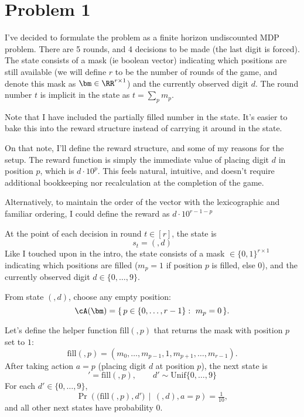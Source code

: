 \documentclass[12pt]{article}
\begin{document}
\psetheader %

\section*{Problem 1}


I've decided to formulate the problem as a finite horizon undiscounted MDP problem. There
are 5 rounds, and 4 decisions to be made (the last digit is forced). The state consists of a mask
(ie boolean vector) indicating which positions are still available (we will define
$r$ to be the number of rounds of the game, and denote this mask as $\bm \in \RR^{r \times 1}$)
and the currently observed digit $d$. The round number $t$ is implicit in the state as $t=\sum_p m_p$.

Note that I have  included the partially filled number in the state. It's easier to bake this
into the reward structure instead of carrying it around in the state.

On that note, I'll define the reward structure, and some of my reasons for the setup. The reward
function is simply the immediate value of placing digit $d$ in position $p$, which is $d\cdot 10^p$. This
feels natural, intuitive, and doesn't require additional bookkeeping nor recalculation at the completion
of the game.

Alternatively, to maintain the order of the vector with the lexicographic and familiar ordering, I could define
the reward as $d\cdot 10^{r-1-p}$

\medskip
\noindent{} At the point of each decision in round $t \in [r]$, the state is
$$s_t = (\bm,d)$$
Like I touched upon in the intro, the state consists of a mask $\bm \in \{0,1\}^{r \times 1}$ indicating which positions are filled
($m_p=1$ if position $p$ is filled, else $0$), and the currently observed digit $d \in \{0,\ldots,9\}$.

\medskip
\noindent{} From state $(\bm,d)$, choose any empty position:
\[
		\cA(\bm)=\{\,p\in\{0,\ldots,r-1\}:\ m_p=0\,\}.
\]

\medskip
\noindent{} Let's define the helper function $\mathrm{fill}(\bm,p)$ that returns the mask with position $p$ set to $1$:
\[
		\mathrm{fill}(\bm,p) = (m_0,\ldots,m_{p-1},1,m_{p+1},\ldots,m_{r-1}).
\]
After taking action $a=p$ (placing digit $d$ at position $p$), the next state is
\[
		\bm'=\mathrm{fill}(\bm,p), \qquad d' \sim \mathrm{Unif}\{0,\ldots,9\}
\]
For each $d'\in\{0,\ldots,9\}$,
\[
		\Pr\!\left(\big(\mathrm{fill}(\bm,p),d'\big)\,\middle|\,(\bm,d),a=p\right)=\tfrac{1}{10},
\]
and all other next states have probability $0$.
\end{document}
